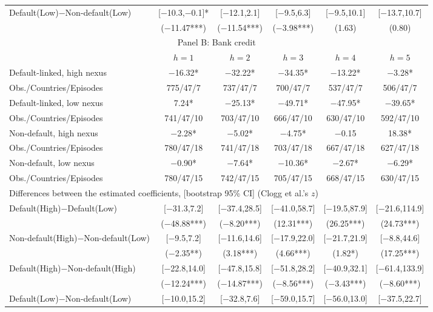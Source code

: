 \documentclass[12pt]{article}
\begin{document}
\begin{longtable}{lccccc}
Default(Low)$-$Non-default(Low) & [$-$10.3,$-$0.1]* & [$-$12.1,2.1] & [$-$9.5,6.3] & [$-$9.5,10.1] & [$-$13.7,10.7] \\
 & ($-$11.47***) & ($-$11.54***) & ($-$3.98***) & (1.63) & (0.80) \\[5pt]
\multicolumn{6}{c}{\large Panel B: Bank credit} \\
\toprule
 & $h=1$ & $h=2$ & $h=3$ & $h=4$ & $h=5$ \\
\midrule
Default-linked, high nexus & $-$16.32* & $-$32.22* & $-$34.35* & $-$13.22* & $-$3.28* \\
Obs./Countries/Episodes & 775/47/7 & 737/47/7 & 700/47/7 & 537/47/7 & 506/47/7 \\[2pt]
Default-linked, low nexus & 7.24* & $-$25.13* & $-$49.71* & $-$47.95* & $-$39.65* \\
Obs./Countries/Episodes & 741/47/10 & 703/47/10 & 666/47/10 & 630/47/10 & 592/47/10 \\[2pt]
Non-default, high nexus & $-$2.28* & $-$5.02* & $-$4.75* & $-$0.15 & 18.38* \\
Obs./Countries/Episodes & 780/47/18 & 741/47/18 & 703/47/18 & 667/47/18 & 627/47/18 \\[2pt]
Non-default, low nexus & $-$0.90* & $-$7.64* & $-$10.36* & $-$2.67* & $-$6.29* \\
Obs./Countries/Episodes & 780/47/15 & 742/47/15 & 705/47/15 & 668/47/15 & 630/47/15 \\[4pt]
\multicolumn{6}{l}{Differences between the estimated coefficients, [bootstrap 95\% CI] (Clogg et al.'s $z$)} \\[2pt]
Default(High)$-$Default(Low) & [$-$31.3,7.2] & [$-$37.4,28.5] & [$-$41.0,58.7] & [$-$19.5,87.9] & [$-$21.6,114.9] \\
 & ($-$48.88***) & ($-$8.20***) & (12.31***) & (26.25***) & (24.73***) \\[2pt]
Non-default(High)$-$Non-default(Low) & [$-$9.5,7.2] & [$-$11.6,14.6] & [$-$17.9,22.0] & [$-$21.7,21.9] & [$-$8.8,44.6] \\
 & ($-$2.35**) & (3.18***) & (4.66***) & (1.82*) & (17.25***) \\[6pt]
Default(High)$-$Non-default(High) & [$-$22.8,14.0] & [$-$47.8,15.8] & [$-$51.8,28.2] & [$-$40.9,32.1] & [$-$61.4,133.9] \\
 & ($-$12.24***) & ($-$14.87***) & ($-$8.56***) & ($-$3.43***) & ($-$8.60***) \\[2pt]
Default(Low)$-$Non-default(Low) & [$-$10.0,15.2] & [$-$32.8,7.6] & [$-$59.0,15.7] & [$-$56.0,13.0] & [$-$37.5,22.7] \\

\end{longtable}
\end{document}
